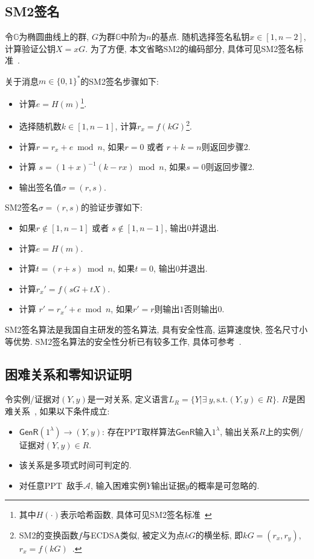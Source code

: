 \documentclass[review]{jcr}
\begin{document}
\subsection{SM2签名}
令$\mathbb{G}$为椭圆曲线上的群, $G$为群$\mathbb{G}$中阶为$n$的基点. 随机选择签名私钥$x\in [1,n-2]$, 计算验证公钥$X=xG$. 为了方便, 本文省略SM2的编码部分, 具体可见SM2签名标准~\cite{SM2}. 

关于消息$m \in \{0, 1\}^*$的SM2签名步骤如下: 

\begin{itemize}
\item[1.] 计算$e = H(m)$\footnote{其中$H(\cdot)$表示哈希函数, 具体可见SM2签名标准~\cite{SM2}}. 
\item[2.] 选择随机数$k\in [1,n-1]$, 计算$r_x=f(kG)$\footnote{SM2的变换函数$f$与ECDSA类似, 被定义为点$kG$的横坐标, 即$kG=(r_x,r_y)$, $r_x=f(kG)$~\cite{ZhangYZC15,AumayrEEFHMMR20}.}. 
\item[3.] 计算$r = r_x + e \bmod n$, 如果$r = 0$ 或者 $r + k = n$则返回步骤2. 
\item[4.] 计算 $s=(1+x)^{-1}(k-rx) \bmod n$, 如果$s=0$则返回步骤2. 
\item[5.] 输出签名值$\sigma = (r, s)$. 
\end{itemize}

SM2签名$\sigma = (r, s)$的验证步骤如下:  
\begin{itemize}
\item[1.] 如果$r\notin [1,n − 1]$ 或者 $s\notin [1,n − 1]$, 输出$0$并退出.
\item[2.] 计算$e = H(m)$. 
\item[3.] 计算$t=(r+s) \bmod n$, 如果$t=0$, 输出$0$并退出. 
\item[4.] 计算$r_x'=f(sG+tX)$. 
\item[5.] 计算 $r'=r_x'+e \bmod n$, 如果$r'=r$则输出$1$否则输出$0$. 
\end{itemize}

SM2签名算法是我国自主研发的签名算法, 具有安全性高, 运算速度快, 签名尺寸小等优势. SM2签名算法的安全性分析已有较多工作, 具体可参考~\cite{ZhangYZC15,SM2-survey,SM2}.

\subsection{困难关系和零知识证明}

令实例/证据对$(Y,y)$是一对关系, 定义语言$L_R=\{Y|\exists\ y, \text{s.t.} (Y,y)\in R\}$. $R$是困难关系~\cite{AumayrEEFHMMR20}, 如果以下条件成立: 
\begin{itemize}
  \item $\mathsf{GenR}(1^\lambda)\rightarrow (Y,y)$: 存在PPT取样算法$\mathsf{GenR}$输入$1^\lambda$, 输出关系$R$上的实例/证据对$(Y,y)\in R$.

  \item 该关系是多项式时间可判定的. 

  \item 对任意PPT\ 敌手$\mathcal{A}$, 输入困难实例$Y$输出证据$y$的概率是可忽略的.
\end{itemize}
\end{document}
